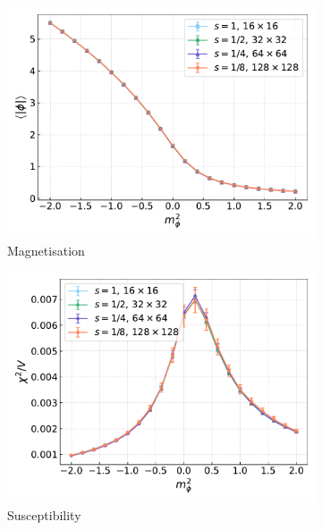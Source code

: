 \begin{figure}[hbp]
    \centering
    \begin{subfigure}[b]{0.47\textwidth}
        \includegraphics[width=\textwidth]{figures/cooling/mass_scan/magnetisation.pdf}
        \caption{Magnetisation}
    \end{subfigure}
    \hfill
    \begin{subfigure}[b]{0.47\textwidth}
        \includegraphics[width=\textwidth]{figures/cooling/mass_scan/susceptibility.pdf}
        \caption{Susceptibility}
    \end{subfigure}
    \begin{subfigure}[b]{0.47\textwidth}

\end{subfigure}
\end{figure}
